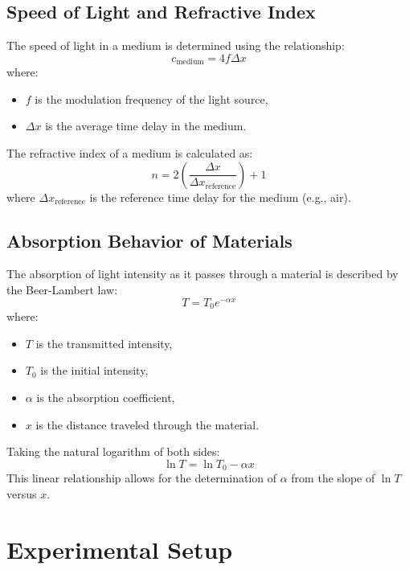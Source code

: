 \documentclass[journal]{IEEEtran}
\begin{document}
\subsection{Speed of Light and Refractive Index}
The speed of light in a medium is determined using the relationship:
\begin{equation}
    c_{\text{medium}} = 4f \Delta x
    \label{eq:speed_of_light}
\end{equation}
where:
\begin{itemize}
    \item $f$ is the modulation frequency of the light source,
    \item $\Delta x$ is the average time delay in the medium.
\end{itemize}

The refractive index of a medium is calculated as:
\begin{equation}
    n = 2 \left( \frac{\Delta x}{\Delta x_{\text{reference}}} \right) + 1
    \label{eq:refractive_index}
\end{equation}
where $\Delta x_{\text{reference}}$ is the reference time delay for the medium (e.g., air).

\subsection{Absorption Behavior of Materials}
The absorption of light intensity as it passes through a material is described by the Beer-Lambert law:
\begin{equation}
    T = T_0 e^{-\alpha x}
    \label{eq:attenuation}
\end{equation}
where:
\begin{itemize}
    \item $T$ is the transmitted intensity,
    \item $T_0$ is the initial intensity,
    \item $\alpha$ is the absorption coefficient,
    \item $x$ is the distance traveled through the material.
\end{itemize}

Taking the natural logarithm of both sides:
\begin{equation}
    \ln T = \ln T_0 - \alpha x
    \label{eq:log_attenuation}
\end{equation}
This linear relationship allows for the determination of $\alpha$ from the slope of $\ln T$ versus $x$.

\section{Experimental Setup}
\end{document}
